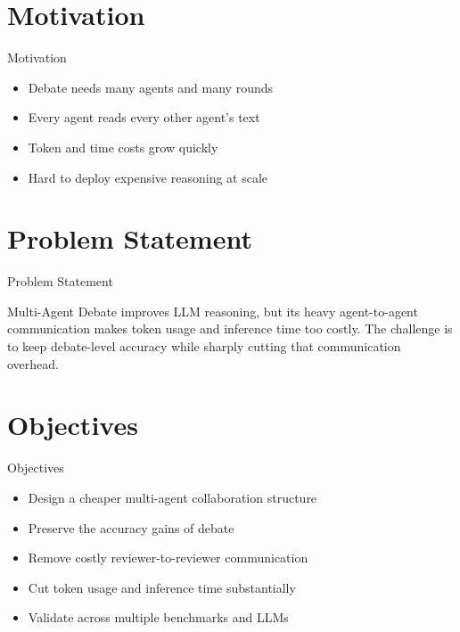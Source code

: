 \documentclass[10pt]{beamer}
\begin{document}
\section{Motivation}
\begin{frame}{Motivation}
\begin{itemize}
  \item Debate needs many agents and many rounds
  \item Every agent reads every other agent's text
  \item Token and time costs grow quickly
  \item Hard to deploy expensive reasoning at scale
\end{itemize}
\end{frame}

\section{Problem Statement}
\begin{frame}{Problem Statement}
  \begin{block}{}
  Multi-Agent Debate improves LLM reasoning, but its heavy agent-to-agent communication makes token usage and inference time too costly. The challenge is to keep debate-level accuracy while sharply cutting that communication overhead.
  \end{block}
\end{frame}

\section{Objectives}
\begin{frame}{Objectives}
\begin{itemize}
  \item Design a cheaper multi-agent collaboration structure
  \item Preserve the accuracy gains of debate
  \item Remove costly reviewer-to-reviewer communication
  \item Cut token usage and inference time substantially
  \item Validate across multiple benchmarks and LLMs
\end{itemize}
\end{frame}
\end{document}
